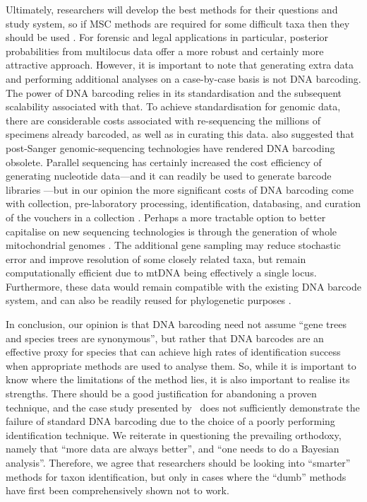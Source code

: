 \documentclass[12pt]{article}
\begin{document}
Ultimately, researchers will develop the best methods for their questions and study system, so if MSC methods are required for some difficult taxa then they should be used \citep{Dupuis2012}. For forensic and legal applications in particular, posterior probabilities from multilocus data offer a more robust and certainly more attractive approach. However, it is important to note that generating extra data and performing additional analyses on a case-by-case basis is not DNA barcoding. The power of DNA barcoding relies in its standardisation and the subsequent scalability associated with that. To achieve standardisation for genomic data, there are considerable costs associated with re-sequencing the millions of specimens already barcoded, as well as in curating this data. \citet{Taylor2012} also suggested that post-Sanger genomic-sequencing technologies have rendered DNA barcoding obsolete. Parallel sequencing has certainly increased the cost efficiency of generating nucleotide data---and it can readily be used to generate barcode libraries \citep{Shokralla2014}---but in our opinion the more significant costs of DNA barcoding come with collection, pre-laboratory processing, identification, databasing, and curation of the vouchers in a collection \citep{Gregory2005,Borisenko2009,Puillandre2012a}. Perhaps a more tractable option to better capitalise on new sequencing technologies is through the generation of whole mitochondrial genomes \citep[see][]{Gillett2014}. The additional gene sampling may reduce stochastic error and improve resolution of some closely related taxa, but remain computationally efficient due to mtDNA being effectively a single locus. Furthermore, these data would remain compatible with the existing DNA barcode system, and can also be readily reused for phylogenetic purposes \citep{Gillett2014}.

In conclusion, our opinion is that DNA barcoding need not assume ``gene trees and species trees are synonymous'', but rather that DNA barcodes are an effective proxy for species that can achieve high rates of identification success when appropriate methods are used to analyse them. So, while it is important to know where the limitations of the method lies, it is also important to realise its strengths. There should be a good justification for abandoning a proven technique, and the case study presented by \citeauthor{Dowton2014}\ does not sufficiently demonstrate the failure of standard DNA barcoding due to the choice of a poorly performing identification technique.  We reiterate \citet{Karl2012} in questioning the prevailing orthodoxy, namely that ``more data are always better'', and ``one needs to do a Bayesian analysis''. Therefore, we agree that researchers should be looking into ``smarter'' methods for taxon identification, but only in cases where the ``dumb'' methods have first been comprehensively shown not to work.
\end{document}
